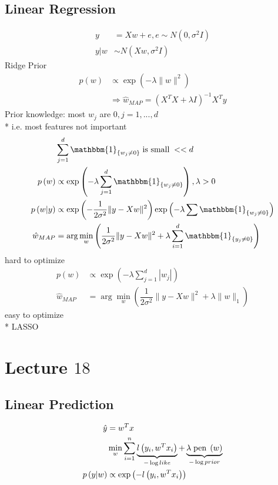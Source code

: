 \documentclass{article}
\begin{document}
\subsection{Linear Regression}
\begin{align*}
y  &= X w + e, e \sim  N\left(0, \sigma^{2} I \right)
\\ y  | w &  \sim  N\left(X w, \sigma^{2} I \right)
\end{align*}
Ridge Prior
\begin{align*}
p\left(w\right)  &  \propto \exp\left(- \lambda \| w \|^{2}\right)
\\ &\Rightarrow  \hat{w}_{MAP} = \left(X^{T} X + \lambda I\right)^{-1} X^{T} y 
\end{align*}
Prior knowledge: most $w_{j}$ are $0, j  = 1, ..., d $
\\* i.e. most features not important
\begin{align*}
&  \displaystyle\sum_{j=1}^{d} \mathbbm{1}_{\left\{w_{j} \neq  0\right\}} \text{\;is small\;} << d 
\\ p\left(w\right)  &  \propto \exp\left(- \lambda \displaystyle\sum_{j=1}^{d} \mathbbm{1}_{\left\{w_{j} \neq  0\right\}}\right), \lambda > 0
\\ p\left(w | y\right)  &  \propto \exp\left(- \dfrac{1}{2 \sigma^{2}} \| y - X w \|^{2}\right) \exp\left(-\lambda \displaystyle\sum \mathbbm{1}_{\left\{w_{j} \neq  0\right\}}\right)
\\ \hat{w}_{MAP} &= \arg\displaystyle\min_{w} \left(\dfrac{1}{2 \sigma^{2}} \| y - X w \|^{2} + \lambda \displaystyle\sum_{i=1}^{d} \mathbbm{1}_{\left\{y_{j} \neq  0\right\}}\right)
\end{align*}
hard to optimize
\begin{align*}
p\left(w\right)  &  \propto \exp \left(-\lambda \displaystyle\sum_{j=1}^{d} | w_{j} |\right)
\\ \hat{w}_{MAP} &= \arg\displaystyle\min_{w} \left(\dfrac{1}{2 \sigma^{2}} \| y - X w \|^{2} + \lambda \| w \|_{1}\right)
\end{align*}
easy to optimize
\\* LASSO






\section{Lecture $18$} 

\subsection{Linear Prediction}
\begin{align*}
\hat{y} &= w^{T} x 
\\ &  \displaystyle\min_{w} \displaystyle\sum_{i=1}^{n} \underbrace{l\left(y_{i}, w^{T} x_{i}\right)}_{- \log like} + \underbrace{\lambda \text{\;pen\;} \left(w\right)}_{- \log prior}
\\ p\left(y | w\right)  &  \propto \exp\left(- l\left(y_{i}, w^{T} x_{i}\right)\right)
\end{align*}
\end{document}
